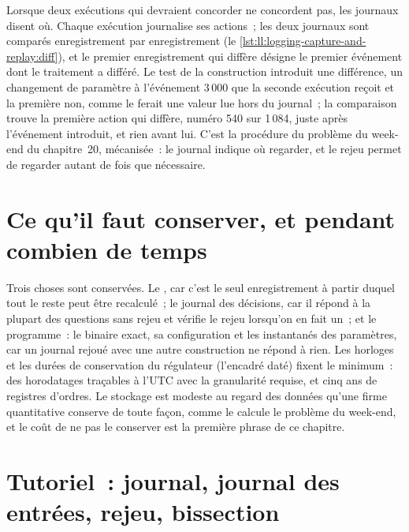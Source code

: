 Lorsque deux exécutions qui devraient concorder ne concordent pas, les journaux disent où. Chaque exécution journalise ses actions~; les deux journaux sont comparés enregistrement par
enregistrement (le \cref{lst:ll:logging-capture-and-replay:diff}), et le premier enregistrement qui diffère désigne le premier événement dont le traitement
a différé. Le test de la construction introduit une différence, un changement de paramètre à l'événement 3\,000 que la seconde exécution reçoit et la première non,
comme le ferait une valeur lue hors du journal~; la comparaison trouve la première action qui diffère,
numéro 540 sur 1\,084, juste après l'événement introduit, et rien avant lui. C'est la procédure du problème du week-end du chapitre~20,
mécanisée~: le journal indique où regarder, et le rejeu permet de regarder autant de fois que nécessaire.

\label{lst:ll:logging-capture-and-replay:diff}

\section{Ce qu'il faut conserver, et pendant combien de temps}

Trois choses sont conservées. Le , car c'est le seul enregistrement à partir duquel tout le reste peut être recalculé~; le
journal des décisions, car il répond à la plupart des questions sans rejeu et vérifie le rejeu lorsqu'on en fait un~; et le programme~:
le binaire exact, sa configuration et les instantanés des paramètres, car un journal rejoué avec une autre construction ne répond
à rien. Les horloges et les durées de conservation du régulateur (l'encadré daté) fixent le minimum~: des horodatages traçables à l'UTC avec
la granularité requise, et cinq ans de registres d'ordres. Le stockage est modeste au regard des données qu'une firme quantitative
conserve de toute façon, comme le calcule le problème du week-end, et le coût de ne pas le conserver est la première phrase de ce chapitre.

\section{Tutoriel~: journal, journal des entrées, rejeu, bissection}\label{tut:ll:logging-capture-and-replay:tut}

